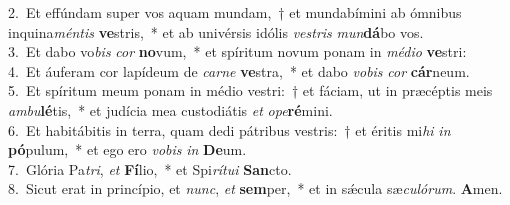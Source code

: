 {2.~}Et effúndam super vos aquam mundam,~† et mundabímini ab ómnibus inquina\textit{mén}\textit{tis} \textbf{ve}stris,~* et ab univérsis idólis \textit{ve}\textit{stris} \textit{mun}\textbf{dá}bo vos.\\
{3.~}Et dabo vo\textit{bis} \textit{cor} \textbf{no}vum,~* et spíritum novum ponam in \textit{mé}\textit{di}\textit{o} \textbf{ve}stri:\\
{4.~}Et áuferam cor lapídeum de \textit{car}\textit{ne} \textbf{ve}stra,~* et dabo \textit{vo}\textit{bis} \textit{cor} \textbf{cár}neum.\\
{5.~}Et spíritum meum ponam in médio vestri:~† et fáciam, ut in præcéptis meis \textit{am}\textit{bu}\textbf{lé}tis,~* et judícia mea custodiátis \textit{et} \textit{o}\textit{pe}\textbf{ré}mini.\\
{6.~}Et habitábitis in terra, quam dedi pátribus vestris:~† et éritis mi\textit{hi} \textit{in} \textbf{pó}pulum,~* et ego ero \textit{vo}\textit{bis} \textit{in} \textbf{De}um.\\
{7.~}Glória Pa\textit{tri}, \textit{et} \textbf{Fí}lio,~* et Spi\textit{rí}\textit{tu}\textit{i} \textbf{San}cto.\\
{8.~}Sicut erat in princípio, et \textit{nunc}, \textit{et} \textbf{sem}per,~* et in sǽcula sæ\textit{cu}\textit{ló}\textit{rum}. \textbf{A}men.\\
